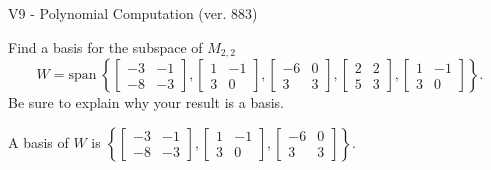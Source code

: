 \begin{exercise}
  \begin{exerciseTitle}V9 - Polynomial Computation (ver. 883)\end{exerciseTitle}
  \begin{exerciseStatement}
    Find a basis for the subspace of \(M_{2,2}\) 
\[W=\mathrm{span}\ \left\{\left[\begin{array}{cc}
-3 & -1 \\
-8 & -3
\end{array}\right] , \left[\begin{array}{cc}
1 & -1 \\
3 & 0
\end{array}\right] , \left[\begin{array}{cc}
-6 & 0 \\
3 & 3
\end{array}\right] , \left[\begin{array}{cc}
2 & 2 \\
5 & 3
\end{array}\right] , \left[\begin{array}{cc}
1 & -1 \\
3 & 0
\end{array}\right]\right\}.\]
 Be sure to explain why your result is a basis.


  \end{exerciseStatement}
  \begin{exerciseAnswer}
   A basis of \(W\) is  \(\left\{\left[\begin{array}{cc}
-3 & -1 \\
-8 & -3
\end{array}\right] , \left[\begin{array}{cc}
1 & -1 \\
3 & 0
\end{array}\right] , \left[\begin{array}{cc}
-6 & 0 \\
3 & 3
\end{array}\right]\right\}\).
  


  \end{exerciseAnswer}
\end{exercise}